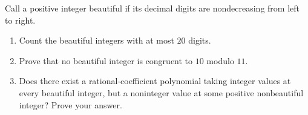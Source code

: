 Call a positive integer beautiful if its decimal digits are nondecreasing from left to right.
\begin{enumerate}\item Count the beautiful integers with at most $20$ digits.
\item Prove that no beautiful integer is congruent to $10$ modulo $11$.
\item Does there exist a rational-coefficient polynomial taking integer values at every beautiful integer, but a noninteger value at some positive nonbeautiful integer? Prove your answer.\end{enumerate}

